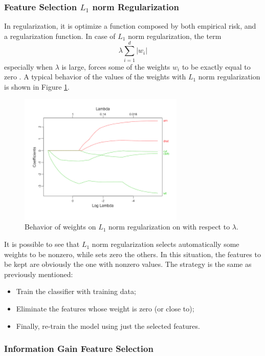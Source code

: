 \subsubsection{Feature Selection $L_1$ norm Regularization}

In regularization, it is optimize a function composed by both empirical risk, and a regularization function. In case of $L_1$ norm regularization, the term
\[ \lambda \sum_{i = 1}^{d} |w_i| \]
especially when $\lambda$ is large, forces some of the weights $w_i$ to be exactly equal to zero \cite{article-lasso}. A typical behavior of the values of the weights with $L_1$ norm regularization is shown in Figure \ref{fig:lasso}.

\begin{figure}[ht]
	\centering
	\includegraphics[width=0.7\textwidth]{figures/lasso.png}
	\caption{Behavior of weights on $L_1$ norm regularization on with respect to $\lambda$.}
	\label{fig:lasso}
\end{figure}

It is possible to see that $L_1$ norm regularization selects automatically some weights to be nonzero, while sets zero the others. In this situation, the features to be kept are obviously the one with nonzero values. The strategy is the same as previously mentioned:

\begin{itemize}
	\item Train the classifier with training data;
	\item Eliminate the features whose weight is zero (or close to);
	\item Finally, re-train the model using just the selected features.
\end{itemize}



\subsubsection{Information Gain Feature Selection}

